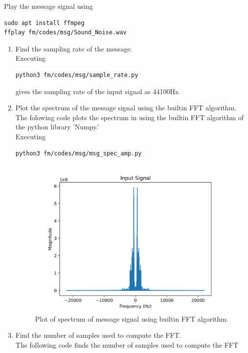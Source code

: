 Play the message signal using
\begin{lstlisting}
sudo apt install ffmpeg
ffplay fm/codes/msg/Sound_Noise.wav
\end{lstlisting}
\begin{enumerate}[label=\arabic*.,ref=\thesection.\theenumi]
\item Find the sampling rate of the message.
\\
	\solution
Executing	
\begin{lstlisting}
python3 fm/codes/msg/sample_rate.py
\end{lstlisting}
gives
the sampling rate of the input signal as 44100Hz.
\item Plot the spectrum of the message signal using the builtin FFT algorithm.\\
	\solution
The folowing code plots the spectrum in  using the builtin FFT algorithm of the python library 'Numpy.'
\\
Executing
\begin{lstlisting}
python3 fm/codes/msg/msg_spec_amp.py
\end{lstlisting}		
\begin{figure}[H]
\centering
\includegraphics[width=\columnwidth]{fm/msg/figs/FFTbuiltin/inputs-1.png}
\caption{Plot of spectrum of message signal using builtin FFT algorithm.}
\label{fig:FFTb}
\end{figure}
\item Find the number of samples used to compute the FFT.\\
	\solution
The following code finds the number of samples used to compute the FFT

\end{enumerate}
